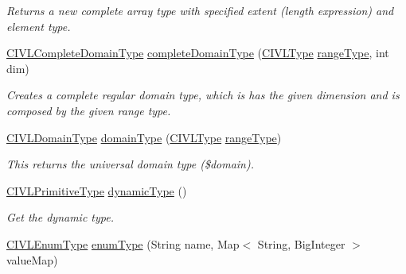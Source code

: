 \begin{DoxyCompactItemize}
\begin{DoxyCompactList}\small\item\em Returns a new complete array type with specified extent (length expression) and element type. \end{DoxyCompactList}\item 
\hyperlink{interfaceedu_1_1udel_1_1cis_1_1vsl_1_1civl_1_1model_1_1IF_1_1type_1_1CIVLCompleteDomainType}{C\+I\+V\+L\+Complete\+Domain\+Type} \hyperlink{interfaceedu_1_1udel_1_1cis_1_1vsl_1_1civl_1_1model_1_1IF_1_1CIVLTypeFactory_ad4ca00d8ee9d2e6b27a5654546e40a82}{complete\+Domain\+Type} (\hyperlink{interfaceedu_1_1udel_1_1cis_1_1vsl_1_1civl_1_1model_1_1IF_1_1type_1_1CIVLType}{C\+I\+V\+L\+Type} \hyperlink{interfaceedu_1_1udel_1_1cis_1_1vsl_1_1civl_1_1model_1_1IF_1_1CIVLTypeFactory_ac9066abf4714e7acbfae8c30f2cdcd71}{range\+Type}, int dim)
\begin{DoxyCompactList}\small\item\em Creates a complete regular domain type, which is has the given dimension and is composed by the given range type. \end{DoxyCompactList}\item 
\hyperlink{interfaceedu_1_1udel_1_1cis_1_1vsl_1_1civl_1_1model_1_1IF_1_1type_1_1CIVLDomainType}{C\+I\+V\+L\+Domain\+Type} \hyperlink{interfaceedu_1_1udel_1_1cis_1_1vsl_1_1civl_1_1model_1_1IF_1_1CIVLTypeFactory_a832912815c287a68e0e9eed3d1ddf707}{domain\+Type} (\hyperlink{interfaceedu_1_1udel_1_1cis_1_1vsl_1_1civl_1_1model_1_1IF_1_1type_1_1CIVLType}{C\+I\+V\+L\+Type} \hyperlink{interfaceedu_1_1udel_1_1cis_1_1vsl_1_1civl_1_1model_1_1IF_1_1CIVLTypeFactory_ac9066abf4714e7acbfae8c30f2cdcd71}{range\+Type})
\begin{DoxyCompactList}\small\item\em This returns the universal domain type ({\ttfamily \$domain}). \end{DoxyCompactList}\item 
\hyperlink{interfaceedu_1_1udel_1_1cis_1_1vsl_1_1civl_1_1model_1_1IF_1_1type_1_1CIVLPrimitiveType}{C\+I\+V\+L\+Primitive\+Type} \hyperlink{interfaceedu_1_1udel_1_1cis_1_1vsl_1_1civl_1_1model_1_1IF_1_1CIVLTypeFactory_abccdc7baed85680513d89f814f30a296}{dynamic\+Type} ()
\begin{DoxyCompactList}\small\item\em Get the dynamic type. \end{DoxyCompactList}\item 
\hyperlink{interfaceedu_1_1udel_1_1cis_1_1vsl_1_1civl_1_1model_1_1IF_1_1type_1_1CIVLEnumType}{C\+I\+V\+L\+Enum\+Type} \hyperlink{interfaceedu_1_1udel_1_1cis_1_1vsl_1_1civl_1_1model_1_1IF_1_1CIVLTypeFactory_afeaa6cc593bcbf0658e7d63d41139dc8}{enum\+Type} (String name, Map$<$ String, Big\+Integer $>$ value\+Map)

\end{DoxyCompactItemize}

